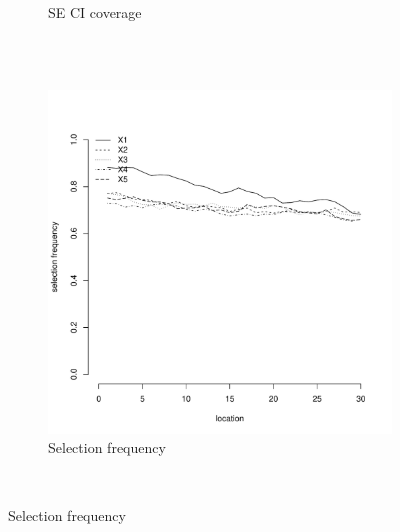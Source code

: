 \documentclass[authoryear, review, 11pt]{elsarticle}
\begin{document}
\begin{figure}
\begin{subfigure}[b]{0.45\textwidth}
		\caption{SE CI coverage}
	\end{subfigure}%
	\\%
	~ %
	\begin{subfigure}[b]{0.45\textwidth}
	\centering
		\includegraphics[width=\textwidth]{../../figures/simulation/15.36.profile_selection.pdf}
		\caption{Selection frequency}
	\end{subfigure}
	~ %

\end{figure}
\end{document}
